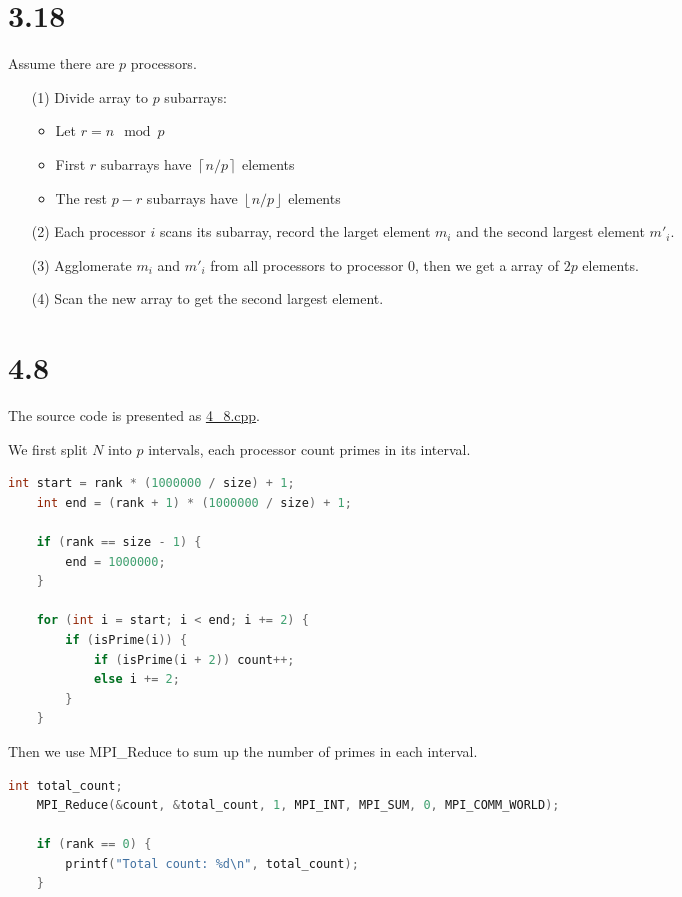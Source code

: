 \section*{3.18}

Assume there are $p$ processors.

\begin{enumerate}
    \item[(1)] Divide array to $p$ subarrays:
        \begin{itemize}
            \item Let $r = n \mod p$
            \item First $r$ subarrays have $\left\lceil n/p \right\rceil$ elements
            \item The rest $p - r$ subarrays have $\left\lfloor n/p\right\rfloor$  elements
        \end{itemize}
    \item[(2)] Each processor $i$ scans its subarray, record the larget element $m_i$ and the second largest element $m'_i$.
    \item[(3)] Agglomerate $m_i$ and $m'_i$ from all processors to processor 0, then we get a array of $2p$ elements.
    \item[(4)] Scan the new array to get the second largest element.
\end{enumerate}

\section*{4.8}

The source code is presented as \href{run:./4_8.cpp}{4\_8.cpp}.

We first split $N$ into $p$ intervals, each processor count primes in its interval. 

\begin{lstlisting}[language=C++]
    int start = rank * (1000000 / size) + 1;
    int end = (rank + 1) * (1000000 / size) + 1;
    
    if (rank == size - 1) {
        end = 1000000;
    }

    for (int i = start; i < end; i += 2) {
        if (isPrime(i)) {
            if (isPrime(i + 2)) count++;
            else i += 2;
        }
    }
\end{lstlisting}

Then we use MPI\_Reduce to sum up the number of primes in each interval.

\begin{lstlisting}[language=C++]
    int total_count;
    MPI_Reduce(&count, &total_count, 1, MPI_INT, MPI_SUM, 0, MPI_COMM_WORLD);
    
    if (rank == 0) {
        printf("Total count: %d\n", total_count);
    }
\end{lstlisting}


